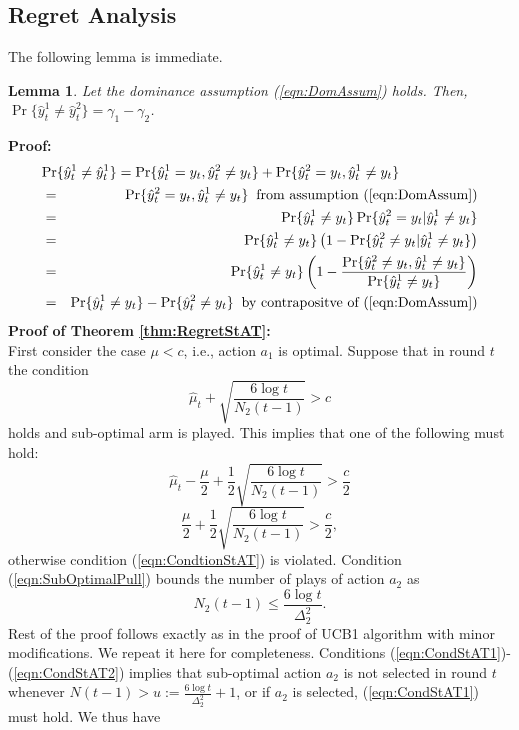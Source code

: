 \documentclass[draft, onecolumn, 12pt]{IEEEtran}
\newtheorem{lemma}{Lemma}
\begin{document}
\subsection{Regret Analysis}
The following lemma is immediate.
\begin{lemma}
Let the dominance assumption (\ref{eqn:DomAssum}) holds. Then, $\Pr\{\hat{y}^1_t \neq \hat{y}^2_t\}=\gamma_1-\gamma_2$.
\end{lemma}
{\bf Proof:}
\begin{eqnarray}
\lefteqn{\Pr\{\hat{y}^1_t \neq \hat{y}^1_t\}=\Pr\{\hat{y}^1_t=y_t, \hat{y}^2_t \neq y_t\} + \Pr\{\hat{y}^2_t=y_t, \hat{y}^1_t \neq y_t\}} \\
&=& \Pr\{\hat{y}^2_t=y_t, \hat{y}^1_t \neq y_t\} \;\;\mbox{from assumption (\ref{eqn:DomAssum})}\\
&=& \Pr\{\hat{y}^1_t\neq y_t\}\Pr\{\hat{y}^2_t= y_t| \hat{y}^1_t\neq y_t\} \\
&=& \Pr\{\hat{y}^1_t\neq y_t\}\left( 1-\Pr\{\hat{y}^2_t \neq  y_t| \hat{y}^1_t\neq y_t\} \right ) \\
&=& \Pr\{\hat{y}^1_t\neq y_t\}\left( 1-\frac{\Pr\{\hat{y}^2_t \neq  y_t, \hat{y}^1_t\neq y_t\}}{\Pr\{\hat{y}^1_t\neq y_t\}} \right )\\
&=& \Pr\{\hat{y}^1_t\neq y_t\}-\Pr\{\hat{y}^2_t \neq  y_t\}  \;\; \mbox{by contrapositve of (\ref{eqn:DomAssum})} 
\end{eqnarray}
\noindent
{\bf Proof of Theorem \ref{thm:RegretStAT}:}\\
First consider the case  $\mu<c $, i.e., action $a_1$ is optimal. Suppose that in round $t$ the condition
\begin{equation}
\label{eqn:CondtionStAT}
\hat{\mu}_t+ \sqrt{\frac{6\log t}{N_2(t-1)}}>c
\end{equation}
holds and sub-optimal arm is played. This implies that one of the following must hold:
\begin{equation}
\label{eqn:CondStAT1}
\hat{\mu}_t- \frac{\mu}{2} + \frac{1}{2}\sqrt{\frac{6\log t}{N_2(t-1)}}>\frac{c}{2}
\end{equation}
\begin{equation}
\label{eqn:SubOptimalPull}
\frac{\mu}{2} + \frac{1}{2}\sqrt{\frac{6\log t}{N_2(t-1)}}>\frac{c}{2},
\end{equation}
otherwise condition (\ref{eqn:CondtionStAT}) is violated. Condition (\ref{eqn:SubOptimalPull}) bounds the number of  plays of action $a_2$ as 
\begin{equation}
\label{eqn:CondStAT2}
N_2(t-1)\leq \frac{6 \log t}{\Delta_2^2}.
\end{equation} 
Rest of the proof follows exactly as in the proof of UCB1 algorithm with minor modifications. We repeat it here for completeness. 
Conditions (\ref{eqn:CondStAT1})-
(\ref{eqn:CondStAT2}) implies that sub-optimal action $a_2$ is not selected in round $t$ whenever $N(t-1)> u:=\frac{6 \log t}{\Delta_2^2} +1$, or if $a_2$ is selected, (\ref{eqn:CondStAT1}) must hold.
We thus have
\end{document}
